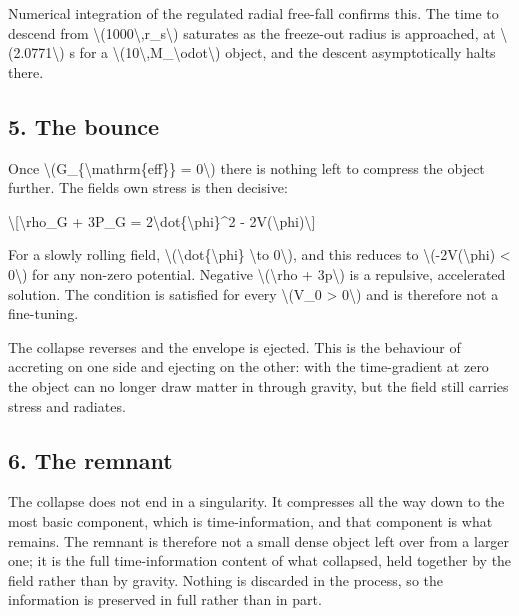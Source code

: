 \documentclass[
  10pt,
]{article}
\begin{document}
Numerical integration of the regulated radial free-fall confirms this.
The time to descend from
\textbackslash(1000\textbackslash,r\_s\textbackslash) saturates as the
freeze-out radius is approached, at \textbackslash(2.0771\textbackslash)
s for a
\textbackslash(10\textbackslash,M\_\textbackslash odot\textbackslash)
object, and the descent asymptotically halts there.

\hypertarget{the-bounce}{%
\subsection{5. The bounce}\label{the-bounce}}

Once \textbackslash(G\_\{\textbackslash mathrm\{eff\}\} =
0\textbackslash) there is nothing left to compress the object further.
The field\textquotesingle s own stress is then decisive:

\textbackslash{[}\textbackslash rho\_G + 3P\_G =
2\textbackslash dot\{\textbackslash phi\}\^{}2 -
2V(\textbackslash phi)\textbackslash{]}

For a slowly rolling field,
\textbackslash(\textbackslash dot\{\textbackslash phi\}
\textbackslash to 0\textbackslash), and this reduces to
\textbackslash(-2V(\textbackslash phi) \textless{} 0\textbackslash) for
any non-zero potential. Negative \textbackslash(\textbackslash rho +
3p\textbackslash) is a repulsive, accelerated solution. The condition is
satisfied for every \textbackslash(V\_0 \textgreater{} 0\textbackslash)
and is therefore not a fine-tuning.

The collapse reverses and the envelope is ejected. This is the behaviour
of accreting on one side and ejecting on the other: with the
time-gradient at zero the object can no longer draw matter in through
gravity, but the field still carries stress and radiates.

\hypertarget{the-remnant}{%
\subsection{6. The remnant}\label{the-remnant}}

The collapse does not end in a singularity. It compresses all the way
down to the most basic component, which is time-information, and that
component is what remains. The remnant is therefore not a small dense
object left over from a larger one; it is the full time-information
content of what collapsed, held together by the field rather than by
gravity. Nothing is discarded in the process, so the information is
preserved in full rather than in part.
\end{document}
